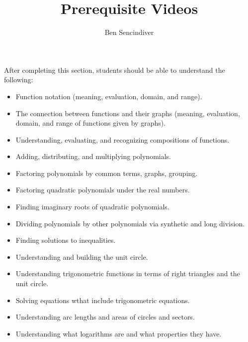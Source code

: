 \documentclass{ximera}
\title{Prerequisite Videos}
\author{Ben Sencindiver}
\begin{document}
\begin{abstract}
\end{abstract}

\maketitle

\begin{sectionOutcomes}
After completing this section, students should be able to understand the following:

\begin{itemize}
	\item Function notation (meaning, evaluation, domain, and range).
    \item The connection between functions and their graphs (meaning, evaluation, domain, and range of functions given by graphs).
    \item Understanding, evaluating, and recognizing compositions of functions.
    \item Adding, distributing, and multiplying polynomials.
    \item Factoring polynomials by common terms, graphs, grouping.
    \item Factoring quadratic polynomials under the real numbers.
    \item Finding imaginary roots of quadratic polynomials.
    \item Dividing polynomials by other polynomials via synthetic and long division.
    \item Finding solutions to inequalities.
    \item Understanding and building the unit circle.
    \item Understanding trigonometric functions in terms of right triangles
    and the unit circle.
    \item Solving equations wthat include trigonometric equations.
    \item Understanding arc lengths and areas of circles and sectors.
    \item Understanding what logarithms are and what properties they have.
\end{itemize}


\end{sectionOutcomes}
\end{document}
